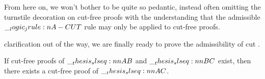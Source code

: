 From here on, we won't bother to be quite so pedantic, instead often omitting the turnstile decoration on cut-free proofs with the understanding that the admissible $\__logic_jrule:n {A-CUT}$ rule may only be applied to cut-free proofs.



 clarification out of the way, we are finally ready to prove the admissibility of cut .

\begin{lemma}\label{lem:singleton-logic:cut-admissibility}
  If cut-free proofs of $\slseq{A |- B}$ and $\slseq{B |- C}$ exist, then there exists a cut-free proof of $\slseq{A |- C}$.
\end{lemma}
%
